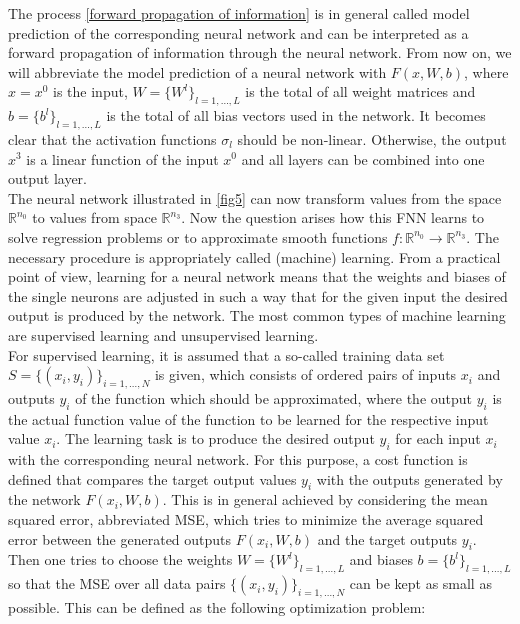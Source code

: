 The process \cref{forward propagation of information} is in general called model prediction of the corresponding neural network and can be interpreted as a forward propagation of information through the neural network. From now on, we will abbreviate the model prediction of a neural network with $F(x, W, b)$, where $x = x^0$ is the input, $W = \{ W^l \}_{l = 1, \ldots, L}$ is the total of all weight matrices and $b = \{ b^l \}_{l = 1, \ldots, L}$ is the total of all bias vectors used in the network. It becomes clear that the activation functions $\sigma_l$ should be non-linear. Otherwise, the output $x^3$ is a linear function of the input $x^0$ and all layers can be combined into one output layer. \\


The neural network illustrated in \cref{fig5} can now transform values from the space $\mathbb{R}^{n_0}$ to values from space $\mathbb{R}^{n_3}$. Now the question arises how this FNN learns to solve regression problems or to approximate smooth functions $f \colon \mathbb{R}^{n_0} \to \mathbb{R}^{n_3}$. The necessary procedure is appropriately called (machine) learning. From a practical point of view, learning for a neural network means that the weights and biases of the single neurons are adjusted in such a way that for the given input the desired output is produced by the network. The most common types of machine learning are supervised learning and unsupervised learning. \\
For supervised learning, it is assumed that a so-called training data set $S = \{ (x_i, y_i) \}_{i = 1, \ldots, N}$ is given, which consists of ordered pairs of inputs $x_i$ and outputs $y_i$ of the function which should be approximated, where the output $y_i$ is the actual function value of the function to be learned for the respective input value $x_i$. The learning task is to produce the desired output $y_i$ for each input $x_i$ with the corresponding neural network. For this purpose, a cost function is defined that compares the target output values $y_i$ with the outputs generated by the network $F(x_i, W, b)$. This is in general achieved by considering the mean squared error, abbreviated MSE, which tries to minimize the average squared error between the generated outputs $F(x_i, W, b)$ and the target outputs $y_i$. Then one tries to choose the weights $W = \{ W^l \}_{l = 1, \ldots, L}$ and biases $b = \{ b^l \}_{l = 1, \ldots, L}$ so that the MSE over all data pairs $\{ (x_i, y_i) \}_{i = 1, \ldots, N}$ can be kept as small as possible. This can be defined as the following optimization problem: 
